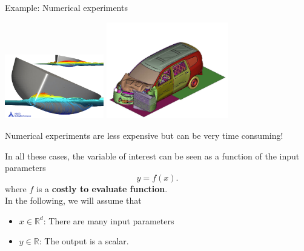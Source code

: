 \documentclass{beamer}
\begin{document}
\begin{frame}{}
\begin{exampleblock}{Example: Numerical experiments}
\begin{center}
\includegraphics[height=2.8cm]{figures/waterflow} \qquad \includegraphics[height=4.2cm]{figures/image15}
\end{center}
Numerical experiments are less expensive but can be very time consuming!
\end{exampleblock}
\end{frame}

\begin{frame}{}
In all these cases, the variable of interest can be seen as a function of the input parameters
$$ y = f(x). $$
where $f$ is a \textbf{costly to evaluate function}. \\
\vspace{5mm}
In the following, we will assume that 
\begin{itemize}
	\item $x \in \mathds{R}^d$: There are many input parameters
	\item $y \in \mathds{R}$: The output is a scalar.
\end{itemize}
\end{frame}
\end{document}
